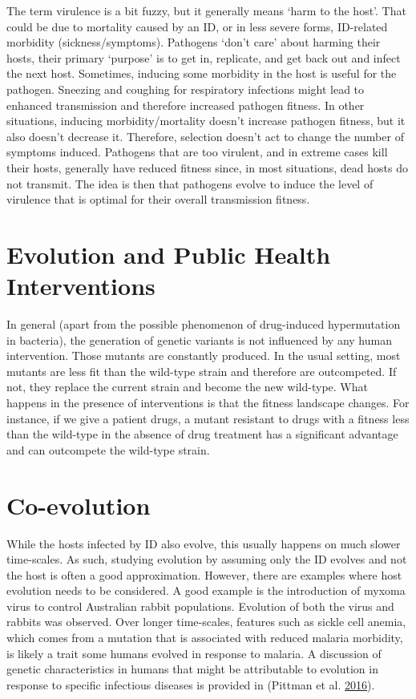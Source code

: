 \documentclass[]{book}
\theoremstyle{definition}
\theoremstyle{definition}
\theoremstyle{definition}
\theoremstyle{remark}
\begin{document}
The term virulence is a bit fuzzy, but it generally means `harm to the
host'. That could be due to mortality caused by an ID, or in less severe
forms, ID-related morbidity (sickness/symptoms). Pathogens `don't care'
about harming their hosts, their primary `purpose' is to get in,
replicate, and get back out and infect the next host. Sometimes,
inducing some morbidity in the host is useful for the pathogen. Sneezing
and coughing for respiratory infections might lead to enhanced
transmission and therefore increased pathogen fitness. In other
situations, inducing morbidity/mortality doesn't increase pathogen
fitness, but it also doesn't decrease it. Therefore, selection doesn't
act to change the number of symptoms induced. Pathogens that are too
virulent, and in extreme cases kill their hosts, generally have reduced
fitness since, in most situations, dead hosts do not transmit. The idea
is then that pathogens evolve to induce the level of virulence that is
optimal for their overall transmission fitness.

\section{Evolution and Public Health
Interventions}\label{evolution-and-public-health-interventions}

In general (apart from the possible phenomenon of drug-induced
hypermutation in bacteria), the generation of genetic variants is not
influenced by any human intervention. Those mutants are constantly
produced. In the usual setting, most mutants are less fit than the
wild-type strain and therefore are outcompeted. If not, they replace the
current strain and become the new wild-type. What happens in the
presence of interventions is that the fitness landscape changes. For
instance, if we give a patient drugs, a mutant resistant to drugs with a
fitness less than the wild-type in the absence of drug treatment has a
significant advantage and can outcompete the wild-type strain.

\section{Co-evolution}\label{co-evolution}

While the hosts infected by ID also evolve, this usually happens on much
slower time-scales. As such, studying evolution by assuming only the ID
evolves and not the host is often a good approximation. However, there
are examples where host evolution needs to be considered. A good example
is the introduction of myxoma virus to control Australian rabbit
populations. Evolution of both the virus and rabbits was observed. Over
longer time-scales, features such as sickle cell anemia, which comes
from a mutation that is associated with reduced malaria morbidity, is
likely a trait some humans evolved in response to malaria. A discussion
of genetic characteristics in humans that might be attributable to
evolution in response to specific infectious diseases is provided in
(Pittman et al. \protect\hyperlink{ref-pittman16}{2016}).
\end{document}
